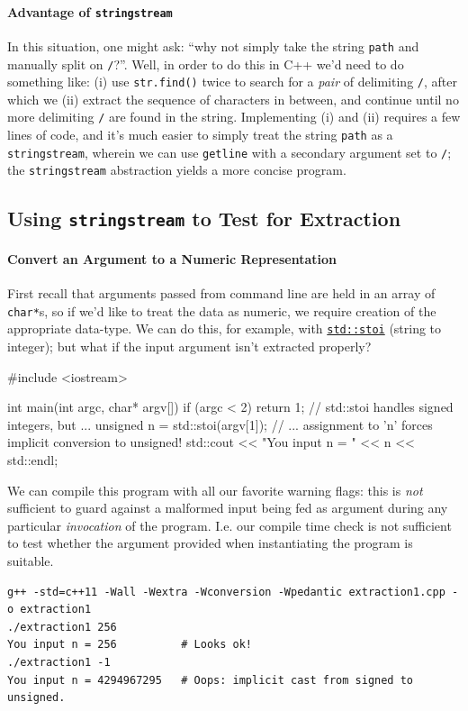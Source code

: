 \documentclass[12pt,letterpaper,twoside]{article}
\begin{document}
\paragraph{Advantage of \texttt{stringstream}} In this situation, one might ask:
``why not simply take the string \texttt{path} and manually split on \texttt{/}?''.
Well, in order to do this in C++ we'd need to do something like: (i)
use \texttt{str.find()} twice to search for a \emph{pair} of delimiting \texttt{/},
after which we (ii) extract the sequence of characters in between, and continue until
no more delimiting \texttt{/} are found in the string. Implementing (i) and (ii) 
requires a few lines of code, and it's much easier to simply treat the string 
\texttt{path} as a \texttt{stringstream}, wherein we can use \texttt{getline} with a 
secondary argument set to \texttt{/}; the \texttt{stringstream} 
abstraction yields a more concise program.

\subsection{Using \texttt{stringstream} to Test for Extraction}
\paragraph{Convert an Argument to a Numeric Representation} First recall that
arguments passed from command line are held in an array of \texttt{char*}s, so if we'd
like to treat the data as numeric, we require creation of the appropriate data-type.
We can do this, for example, with 
\href{https://en.cppreference.com/w/cpp/string/basic_string/stol}{\texttt{std::stoi}} 
(string to integer); but what if the input argument isn't extracted properly?

\begin{cpp}
#include <iostream>

int main(int argc, char* argv[]) {
        if (argc < 2) return 1;
        // std::stoi handles signed integers, but ...
        unsigned n = std::stoi(argv[1]);  // ... assignment to 'n' forces implicit conversion to unsigned!
        std::cout << "You input n = " << n << std::endl;
}
\end{cpp}

We can compile this program with all our favorite warning flags: this is \emph{not}
sufficient to guard against a malformed input being fed as argument during any particular
\emph{invocation} of the program. I.e. our compile time check is not sufficient to test
whether the argument provided when instantiating the program is suitable.
\begin{verbatim}
g++ -std=c++11 -Wall -Wextra -Wconversion -Wpedantic extraction1.cpp -o extraction1
./extraction1 256
You input n = 256          # Looks ok!
./extraction1 -1
You input n = 4294967295   # Oops: implicit cast from signed to unsigned.
\end{verbatim}
\end{document}
